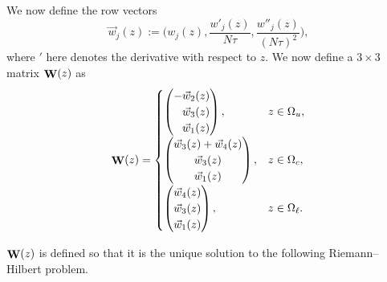 \documentclass[pdftex]{sigma}
\DeclareMathOperator{\WW}{{\bf W}}
\numberwithin{equation}{section}
\begin{document}
We now define the row vectors
\begin{equation*}
 \vec{w}_j(z) := \biggl(w_j(z), \frac{w'_j(z)}{N\tau},\frac{w''_j(z)}{(N\tau)^2}\biggr),
\end{equation*}
where $'$ here denotes the derivative with respect to $z$.
We now define a $3\times 3$ matrix $\WW(z)$ as
 \begin{equation*}
 \WW(z) =
 \begin{cases}
 \begin{pmatrix}
 -\vec{w}_2(z) \\
 \hphantom{-}\vec{w}_3(z) \\
 \hphantom{-}\vec{w}_1(z)
 \end{pmatrix},& z \in\Omega_u, \\[2.5mm]
 \begin{pmatrix}
 \vec{w}_3(z) + \vec{w}_4(z) \\
 \vec{w}_3(z) \\
 \vec{w}_1(z)
 \end{pmatrix}, & z \in \Omega_c,\\[2.5mm]
 \begin{pmatrix}
 \vec{w}_4(z) \\
 \vec{w}_3(z) \\
 \vec{w}_1(z)
 \end{pmatrix}, & z \in \Omega_{\ell}.
 \end{cases}
 \end{equation*}

$\WW(z)$ is defined so that it is the unique solution to the following Riemann--Hilbert problem.
\end{document}

